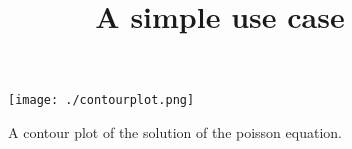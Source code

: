 \documentclass[12pt]{article}
\title{A simple use case}
\begin{document}
\maketitle

\begin{figure}[htb]
	\centering
	\texttt{[image: ./contourplot.png]}
	\caption{A contour plot of the solution of the poisson equation.}%
	\label{fig:contourplot}
\end{figure}
\end{document}
